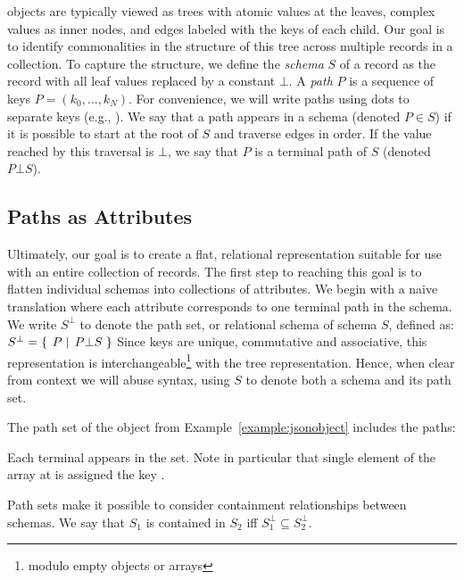 \noindent 
\json objects are typically viewed as trees with atomic values at the leaves, complex values as inner nodes, and edges labeled with the keys of each child.
Our goal is to identify commonalities in the structure of this tree across multiple \json records in a collection.  
To capture the structure, we define the \textit{schema} $S$ of a \json record as the record with all leaf values replaced by a constant $\bot$.
A \emph{path} $P$ is a sequence of keys $P = (k_0, \ldots, k_N)$.
For convenience, we will write paths using dots to separate keys (e.g., ).
We say that a path appears in a schema (denoted $P \in S$) if it is possible to start at the root of $S$ and traverse edges in order. 
If the value reached by this traversal is $\bot$, we say that $P$ is a terminal path of $S$ (denoted $P \bot S$).

\subsection{Paths as Attributes}
Ultimately, our goal is to create a flat, relational representation suitable for use with an entire collection of \json records.
The first step to reaching this goal is to flatten individual \json schemas into collections of attributes.
We begin with a naive translation where each attribute corresponds to one terminal path in the schema.
We write $S^\bot$ to denote the path set, or relational schema of \json schema $S$, defined as:
$
S^\bot = \left\{\left.\;{P}\;\right|\;{P \bot S}\;\right\}
$
Since keys are unique, commutative and associative, this representation is interchangeable\footnote{modulo empty objects or arrays} with the tree representation.
Hence, when clear from context we will abuse syntax, using $S$ to denote both a schema and its path set.
\begin{example}
The path set of the \json object from Example~\ref{example:jsonobject} includes the paths:
\begin{enumerate*}
  \item {} \;
  \item {}
  \item {}\;
  \item {}
\end{enumerate*}
Each terminal appears in the set.  Note in particular that single element of the array at  is assigned the key \inlinejson{[0]}.
\end{example}
Path sets make it possible to consider containment relationships between schemas.  
We say that $S_1$ is contained in $S_2$ iff $S_1^\bot \subseteq S_2^\bot$.


